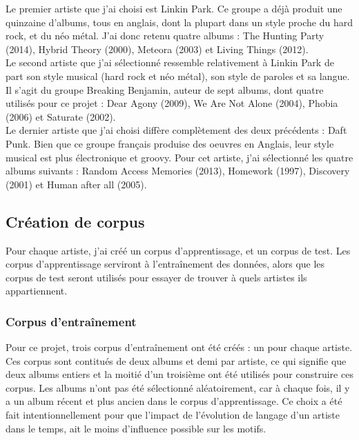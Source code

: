 \documentclass[a4paper]{article}
\begin{document}
	Le premier artiste que j'ai choisi est Linkin Park. Ce groupe a déjà produit une quinzaine d'albums, tous en anglais, dont la plupart dans un style proche du hard rock, et du néo métal. J'ai donc retenu quatre albums : The Hunting Party (2014), Hybrid Theory (2000), Meteora (2003) et Living Things (2012).\\
	
	Le second artiste que j'ai sélectionné ressemble relativement à Linkin Park de part son style musical (hard rock et néo métal), son style de paroles et sa langue. Il s'agit du groupe Breaking Benjamin, auteur de sept albums, dont quatre utilisés pour ce projet : Dear Agony (2009), We Are Not Alone (2004), Phobia (2006) et Saturate (2002).\\
	
	Le dernier artiste que j'ai choisi diffère complètement des deux précédents : Daft Punk. Bien que ce groupe français produise des oeuvres en Anglais, leur style musical est plus électronique et groovy. Pour cet artiste, j'ai sélectionné les quatre albums suivants : Random Access Memories (2013), Homework (1997), Discovery (2001) et Human after all (2005).
	
	\subsection{Création de corpus}
	
	Pour chaque artiste, j'ai créé un corpus d'apprentissage, et un corpus de test. Les corpus d'apprentissage serviront à l'entraînement des données, alors que les corpus de test seront utilisés pour essayer de trouver à quels artistes ils appartiennent.
	
	\subsubsection{Corpus d'entraînement}
	
	Pour ce projet, trois corpus d'entraînement ont été créés : un pour chaque artiste. Ces corpus sont contitués de deux albums et demi par artiste, ce qui signifie que deux albums entiers et la moitié d'un troisième ont été utilisés pour construire ces corpus. Les albums n'ont pas été sélectionné aléatoirement, car à chaque fois, il y a un album récent et plus ancien dans le corpus d'apprentissage. Ce choix a été fait intentionnellement pour que l'impact de l'évolution de langage d'un artiste dans le temps, ait le moins d'influence possible sur les motifs.\\
	
\end{document}
